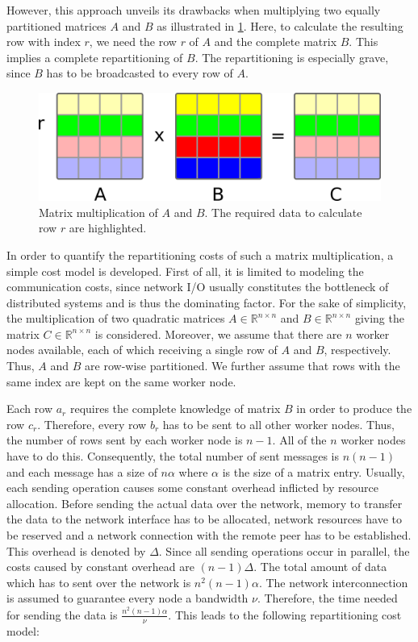 However, this approach unveils its drawbacks when multiplying two equally partitioned matrices $A$ and $B$ as illustrated in \cref{fig:rowPartitioningMM}.
Here, to calculate the resulting row with index $r$, we need the row $r$ of $A$ and the complete matrix $B$.
This implies a complete repartitioning of $B$.
The repartitioning is especially grave, since $B$ has to be broadcasted to every row of $A$.

\begin{figure}[!h]
	\centering
	\includegraphics[width=0.6\linewidth]{images/rowMM.png}
	\caption{Matrix multiplication of $A$ and $B$. The required data to calculate row $r$ are highlighted.}
	\label{fig:rowPartitioningMM}
\end{figure}

In order to quantify the repartitioning costs of such a matrix multiplication, a simple cost model is developed.
First of all, it is limited to modeling the communication costs, since network I/O usually constitutes the bottleneck of distributed systems and is thus the dominating factor.
For the sake of simplicity, the multiplication of two quadratic matrices $A \in \mathbb{R}^{n\times n}$ and $B \in \mathbb{R}^{n\times n}$ giving the matrix $C\in \mathbb{R}^{n \times n}$ is considered.
Moreover, we assume that there are $n$ worker nodes available, each of which receiving a single row of $A$ and $B$, respectively.
Thus, $A$ and $B$ are row-wise partitioned.
We further assume that rows with the same index are kept on the same worker node.

Each row $a_r$ requires the complete knowledge of matrix $B$ in order to produce the row $c_r$.
Therefore, every row $b_r$ has to be sent to all other worker nodes.
Thus, the number of rows sent by each worker node is $n-1$.
All of the $n$ worker nodes have to do this.
Consequently, the total number of sent messages is $n(n-1)$ and each message has a size of $n\alpha$ where $\alpha$ is the size of a matrix entry.
Usually, each sending operation causes some constant overhead inflicted by resource allocation.
Before sending the actual data over the network, memory to transfer the data to the network interface has to be allocated, network resources have to be reserved and a network connection with the remote peer has to be established.
This overhead is denoted by $\Delta$.
Since all sending operations occur in parallel, the costs caused by constant overhead are $(n-1)\Delta$.
The total amount of data which has to sent over the network is $n^2(n-1)\alpha$.
The network interconnection is assumed to guarantee every node a bandwidth $\nu$.
Therefore, the time needed for sending the data is $\frac{n^2(n-1)\alpha}{\nu}$.
This leads to the following repartitioning cost model:

